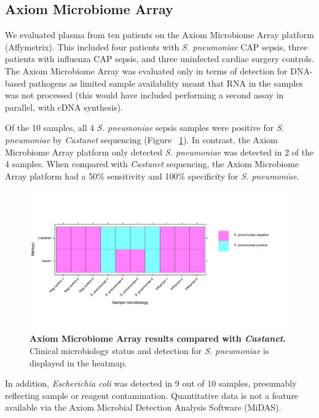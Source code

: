 \subsection{Axiom Microbiome Array}
We evaluated plasma from ten patients on the Axiom Microbiome Array platform (Affymetrix). This included four patients with \textit{S. pneumoniae} CAP sepsis, three patients with influenza CAP sepsis, and three uninfected cardiac surgery controls. The Axiom Microbiome Array was evaluated only in terms of detection for DNA-based pathogens as limited sample availability meant that RNA in the samples was not processed (this would have included performing a second assay in parallel, with cDNA synthesis). 

Of the 10 samples, all 4 \textit{S. pneumoniae} sepsis samples were positive for \textit{S. pneumoniae} by \textit{Castanet} sequencing (Figure ~\ref{fig:axiom}). In contrast, the Axiom Microbiome Array platform only detected \textit{S. pneumoniae} was detected in 2 of the 4 samples. When compared with \textit{Castanet} sequencing, the Axiom Microbiome Array platform had a 50\% sensitivity and 100\% specificity for \textit{S. pneumoniae}. 

\FloatBarrier
\begin{figure}[htbp]
\centering
\includegraphics[scale=0.6]{./Results2/Images/Axiom.pdf}
\caption[Axiom Microbiome Array Results]{\textbf{Axiom Microbiome Array results compared with \textit{Castanet}.} Clinical microbiology status and detection for \textit{S. pneumoniae} is displayed in the heatmap.}
\label{fig:axiom}
\end{figure}

In addition, \textit{Escherichia coli} was detected in 9 out of 10 samples, presumably reflecting sample or reagent contamination. Quantitative data is not a feature available via the Axiom Microbial Detection Analysis Software (MiDAS). 

